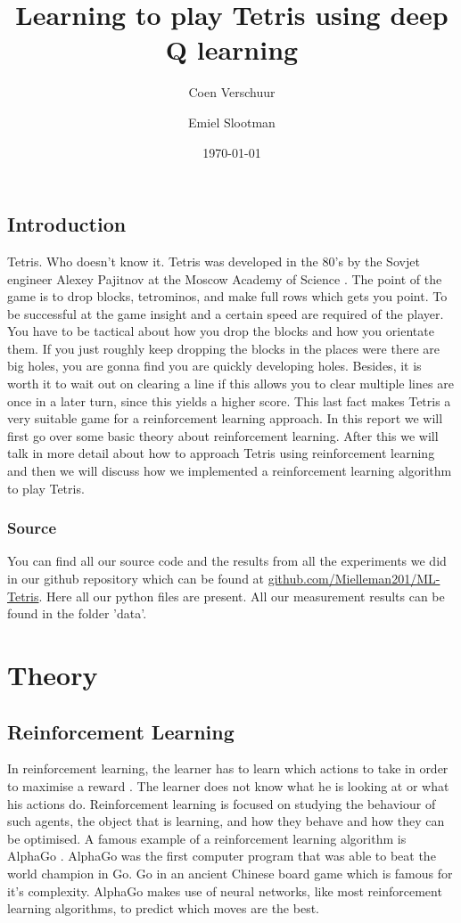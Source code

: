 \documentclass{report}
\title{Learning to play Tetris using deep Q learning}
\author{Coen Verschuur \and Emiel Slootman}
\date{\today}
\begin{document}
\maketitle


\section{Introduction}
Tetris. Who doesn't know it. Tetris was developed in the 80's by the Sovjet engineer Alexey Pajitnov at the Moscow Academy of Science \cite{tet}. The point of the game is to drop blocks, tetrominos, and make full rows which gets you point. To be successful at the game insight and a certain speed are required of the player. You have to be tactical about how you drop the blocks and how you orientate them. If you just roughly keep dropping the blocks in the places were there are big holes, you are gonna find you are quickly developing holes. Besides, it is worth it to wait out on clearing a line if this allows you to clear multiple lines are once in a later turn, since this yields a higher score. This last fact makes Tetris a very suitable game for a reinforcement learning approach.
In this report we will first go over some basic theory about reinforcement learning. After this we will talk in more detail about how to approach Tetris using reinforcement learning and then we will discuss how we implemented a reinforcement learning algorithm to play Tetris.

\subsection*{Source}
You can find all our source code and the results from all the experiments we did in our github repository which can be found at \url{github.com/Mielleman201/ML-Tetris}. Here all our python files are present. All our measurement results can be found in the folder 'data'.

\tableofcontents

\chapter{Theory}
\section{Reinforcement Learning \label{sec:RL}}
In reinforcement learning, the learner has to learn which actions to take in order to maximise a reward \cite[1]{Sutton2018}. The learner does not know what he is looking at or what his actions do. Reinforcement learning is focused on studying the behaviour of such agents, the object that is learning, and how they behave and how they can be optimised. A famous example of a reinforcement learning algorithm is AlphaGo \cite{alphago}. AlphaGo was the first computer program that was able to beat the world champion in Go. Go in an ancient Chinese board game which is famous for it's complexity. AlphaGo makes use of neural networks, like most reinforcement learning algorithms, to predict which moves are the best.
\end{document}
